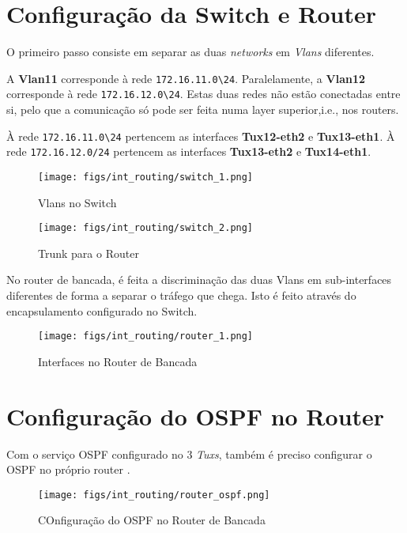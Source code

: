 \pagebreak

\section{Configuração da Switch e Router}

O primeiro passo consiste em separar as duas \textit{networks} em \textit{Vlans} diferentes.

A \textbf{Vlan11} corresponde à rede \verb|172.16.11.0\24|.
Paralelamente, a \textbf{Vlan12} corresponde à rede \verb|172.16.12.0\24|.
Estas duas redes não estão conectadas entre si, pelo que a comunicação só pode ser feita numa layer superior,i.e., nos routers.

À rede \verb|172.16.11.0\24| pertencem as interfaces \textbf{Tux12-eth2} e \textbf{Tux13-eth1}.
À rede \verb|172.16.12.0/24| pertencem as interfaces \textbf{Tux13-eth2} e \textbf{Tux14-eth1}.


\begin{figure}[H]
    \centering
    \texttt{[image: figs/int\_routing/switch\_1.png]}
    \caption{Vlans no Switch}
    \label{fig:switch_1}
\end{figure}

\begin{figure}[H]
    \centering
    \texttt{[image: figs/int\_routing/switch\_2.png]}
    \caption{Trunk para o Router}
    \label{fig:switch_2}
\end{figure}

No router de bancada, é feita a discriminação das duas Vlans em sub-interfaces diferentes de forma a separar o tráfego que chega.
Isto é feito através do encapsulamento configurado no Switch.

\begin{figure}[H]
    \centering
    \texttt{[image: figs/int\_routing/router\_1.png]}
    \caption{Interfaces no Router de Bancada}
    \label{fig:router_1}
\end{figure}

\section{Configuração do OSPF no Router}

Com o serviço OSPF configurado no 3 \textit{Tuxs}, também é preciso configurar o OSPF no próprio router \cite{cisco_ospf}.

\begin{figure}[H]
    \centering
    \texttt{[image: figs/int\_routing/router\_ospf.png]}
    \caption{COnfiguração do OSPF no Router de Bancada}
    \label{fig:router_ospf}
\end{figure}

